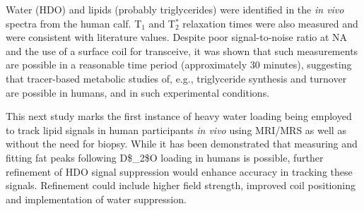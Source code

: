 Water (\ac{HDO}) and lipids (probably triglycerides) were identified in the \textit{in vivo} spectra from the human calf. T$_1$ and T$_2^*$ relaxation times were also measured and were consistent with literature values. Despite poor signal-to-noise ratio at \ac{NA} and the use of a surface coil for transceive, it was shown that such measurements are possible in a reasonable time period (approximately 30 minutes), suggesting that tracer-based metabolic studies of, e.g., triglyceride synthesis and turnover are possible in humans, and in such experimental conditions.  

This next study marks the first instance of heavy water loading being employed to track lipid signals in human participants \textit{in vivo} using \ac{MRI}/\ac{MRS} as well as without the need for biopsy. While it has been demonstrated that measuring and fitting fat peaks following \ac{D$_2$O} loading in humans is possible, further refinement of \ac{HDO} signal suppression would enhance accuracy in tracking these signals. Refinement could include higher field strength, improved coil positioning and implementation of water suppression. 


% 